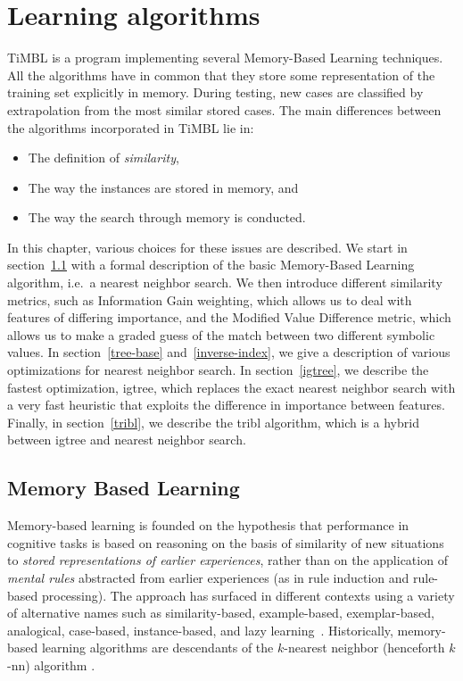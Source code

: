 \documentclass{report}
\begin{document}
\chapter{Learning algorithms}
\label{algorithms}

TiMBL is a program implementing several Memory-Based Learning
techniques. All the algorithms have in common that they store some
representation of the training set explicitly in memory. During
testing, new cases are classified by extrapolation from the most
similar stored cases. The main differences between the algorithms
incorporated in TiMBL lie in:

\begin{itemize}
\item The definition of {\em similarity},
\item The way the instances are stored in memory, and
\item The way the search through memory is conducted.
\end{itemize}

In this chapter, various choices for these issues are described. We
start in section~\ref{mbl} with a formal description of the basic
Memory-Based Learning algorithm, i.e.~a nearest neighbor search. We
then introduce different similarity metrics, such as Information Gain
weighting, which allows us to deal with features of differing
importance, and the Modified Value Difference metric, which allows us
to make a graded guess of the match between two different symbolic
values. In section~\ref{tree-base} and~\ref{inverse-index}, we give a
description of various optimizations for nearest neighbor search. In
section~\ref{igtree}, we describe the fastest optimization, {\sc
igtree}, which replaces the exact nearest neighbor search with a very
fast heuristic that exploits the difference in importance between
features. Finally, in section~\ref{tribl}, we describe the {\sc tribl}
algorithm, which is a hybrid between {\sc igtree} and nearest neighbor
search.

\section{Memory Based Learning}
\label{mbl}

Memory-based learning is founded on the hypothesis that performance in
cognitive tasks is based on reasoning on the basis of similarity of
new situations to {\em stored representations of earlier experiences},
rather than on the application of {\em mental rules}\/ abstracted from
earlier experiences (as in rule induction and rule-based processing).
The approach has surfaced in different contexts using a variety of
alternative names such as similarity-based, example-based,
exemplar-based, analogical, case-based, in\-stance-based, and lazy
learning~\cite{Stanfill+86,Cost+93,Kolodner93,Aha+91,Aha97a}.
Historically, memory-based learning algorithms are descendants of the
$k$-nearest neighbor (henceforth $k$-{\sc nn}) algorithm
\cite{Cover+67,Devijver+82,Aha+91}.
\end{document}
